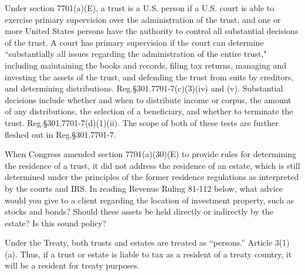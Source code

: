 Under section 7701(a)(E), a trust is a U.S. person if a U.S. court is able to exercise primary supervision over the administration of the trust, and one or more United States persons have the authority to control all substantial decisions of the trust.  A court has primary supervision if the court can determine ``substantially all issues regarding the administration of the entire trust," including maintaining the books and records, filing tax returns, managing and investing the assets of the trust, and defending the trust from suits by creditors, and determining distributions.  Reg.\@ \S301.7701-7(c)(3)(iv) and (v). Substantial decisions include whether and when to distribute income or corpus, the amount of any distributions, the selection of a beneficiary, and whether to terminate the trust.  Reg.\@ \S301.7701-7(d)(1)(ii). The scope of both of these tests are further fleshed out in Reg.\@ \S301.7701-7.

When Congress amended section 7701(a)(30)(E) to provide rules for determining the residence of a trust, it did not address the residence of an estate, which is still determined under the principles of the former residence regulations as interpreted by the courts and IRS.  In reading Revenue Ruling 81-112 below, what advice would you give to a client regarding the location of investment property, such as stocks and bonds?  Should these assets be held directly or indirectly by the estate? Is this sound policy?

Under the Treaty, both trusts and estates are treated as ``persons.''  Article 3(1)(a).  Thus, if a trust or estate is liable to tax as a resident of a treaty country, it will be a resident for treaty purposes.

